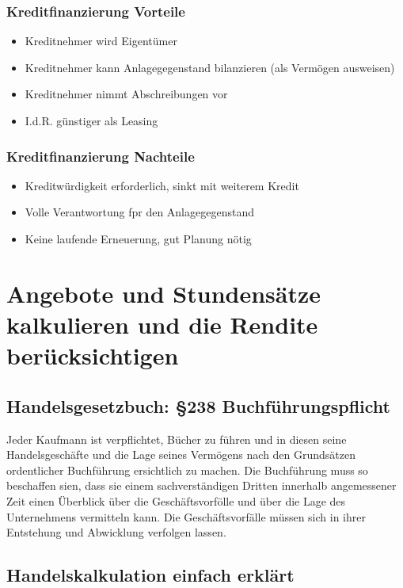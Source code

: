 \documentclass[a4paper, 12pt]{report}
\begin{document}
\subsubsection{Kreditfinanzierung Vorteile}
\begin{itemize}
    \item Kreditnehmer wird Eigentümer
    \item Kreditnehmer kann Anlagegegenstand bilanzieren (als Vermögen
	ausweisen)
    \item Kreditnehmer nimmt Abschreibungen vor
    \item I.d.R. günstiger als Leasing
\end{itemize}

\subsubsection{Kreditfinanzierung Nachteile}
\begin{itemize}
    \item Kreditwürdigkeit erforderlich, sinkt mit weiterem Kredit
    \item Volle Verantwortung fpr den Anlagegegenstand
    \item Keine laufende Erneuerung, gut Planung nötig
\end{itemize}

\section{Angebote und Stundensätze kalkulieren und die Rendite berücksichtigen}
\subsection{Handelsgesetzbuch: \S 238 Buchführungspflicht}

Jeder Kaufmann ist verpflichtet, Bücher zu führen und in diesen seine
Handelsgeschäfte und die Lage seines Vermögens nach den Grundsätzen ordentlicher
Buchführung ersichtlich zu machen. Die Buchführung muss so beschaffen sien, dass
sie einem sachverständigen Dritten innerhalb angemessener Zeit einen Überblick
über die Geschäftsvorfölle und über die Lage des Unternehmens vermitteln kann.
Die Geschäftsvorfälle müssen sich in ihrer Entstehung und Abwicklung verfolgen
lassen.

\subsection{Handelskalkulation einfach erklärt}
\end{document}
